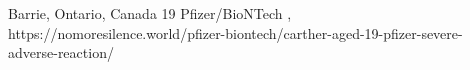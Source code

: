           {
            Barrie, Ontario, Canada
          }
          {
            19
          }
          {
            Pfizer/BioNTech
          }
          {
          }
          {
            ,
          }
          {
            https://nomoresilence.world/pfizer-biontech/carther-aged-19-pfizer-severe-adverse-reaction/
          }

